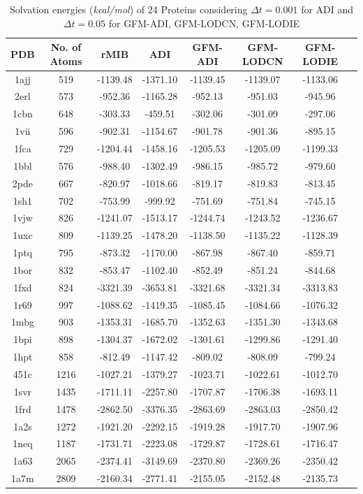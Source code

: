 \begin{table}[!ht]
\centering
\begin{tabular}{ c c c c c c c c}
\hline
\scriptsize{PDB} & \scriptsize{No. of Atoms}& \scriptsize{rMIB}   &   \scriptsize{ADI}    &  \scriptsize{GFM-ADI}  & \scriptsize{GFM-LODCN} & \scriptsize{GFM-LODIE}\\ \hline
1ajj & 519  & -1139.48 & -1371.10 & -1139.45 & -1139.07 & -1133.06 \\
2erl & 573  & -952.36  & -1165.28 & -952.13  & -951.03  & -945.96  \\
1cbn & 648  & -303.33  & -459.51  & -302.06  & -301.09  & -297.06  \\
1vii & 596  & -902.31  & -1154.67 & -901.78  & -901.36  & -895.15  \\
1fca & 729  & -1204.44 & -1458.16 & -1205.53 & -1205.09 & -1199.33 \\
1bbl & 576  & -988.40  & -1302.49 & -986.15  & -985.72  & -979.60  \\
2pde & 667  & -820.97  & -1018.66 & -819.17  & -819.83  & -813.45  \\
1sh1 & 702  & -753.99  & -999.92  & -751.69  & -751.84  & -745.15  \\
1vjw & 826  & -1241.07 & -1513.17 & -1244.74 & -1243.52 & -1236.67 \\
1uxc & 809  & -1139.25 & -1478.20 & -1138.50 & -1135.22 & -1128.39 \\
1ptq & 795  & -873.32  & -1170.00 & -867.98  & -867.40  & -859.71  \\
1bor & 832  & -853.47  & -1102.40 & -852.49  & -851.24  & -844.68  \\
1fxd & 824  & -3321.39 & -3653.81 & -3321.68 & -3321.34 & -3313.83 \\
1r69 & 997  & -1088.62 & -1419.35 & -1085.45 & -1084.66 & -1076.32 \\
1mbg & 903  & -1353.31 & -1685.70 & -1352.63 & -1351.30 & -1343.68 \\
1bpi & 898  & -1304.37 & -1672.02 & -1301.61 & -1299.86 & -1291.40 \\
1hpt & 858  & -812.49  & -1147.42 & -809.02  & -808.09  & -799.24  \\
451c & 1216 & -1027.21 & -1379.27 & -1023.71 & -1022.61 & -1012.70 \\
1svr & 1435 & -1711.11 & -2257.80 & -1707.87 & -1706.38 & -1693.11 \\
1frd & 1478 & -2862.50 & -3376.35 & -2863.69 & -2863.03 & -2850.42 \\
1a2s & 1272 & -1921.20 & -2292.15 & -1919.28 & -1917.70 & -1907.96 \\
1neq & 1187 & -1731.71 & -2223.08 & -1729.87 & -1728.61 & -1716.47 \\
1a63 & 2065 & -2374.41 & -3149.69 & -2370.80 & -2369.26 & -2350.42 \\
1a7m & 2809 & -2160.34 & -2771.41 & -2155.05 & -2152.48 & -2135.73 \\ \hline
\end{tabular}
\caption{Solvation energies ({\it kcal/mol}) of 24 Proteins considering $\Delta t = 0.001$ for ADI and $\Delta t =0.05$ for GFM-ADI, GFM-LODCN, GFM-LODIE}
\label{tab_24protein}
\end{table}
